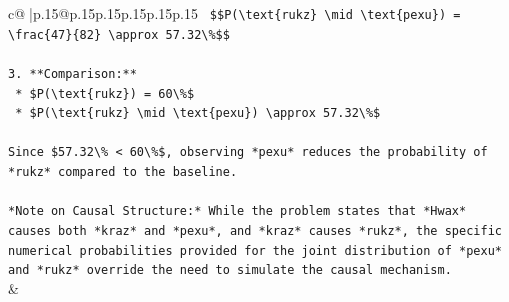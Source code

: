 \documentclass{article}
\begin{document}
{\begin{supertabular}{c@{$\;$}|p{.15\linewidth}@{}p{.15\linewidth}p{.15\linewidth}p{.15\linewidth}p{.15\linewidth}p{.15\linewidth}}
{{{\texttt{    \$\$P(\textbackslash{}text\{rukz\} \textbackslash{}mid \textbackslash{}text\{pexu\}) = \textbackslash{}frac\{47\}\{82\} \textbackslash{}approx 57.32\textbackslash{}\%\$\$} \\
\\ 
\texttt{3.  **Comparison:**} \\
\texttt{    *   \$P(\textbackslash{}text\{rukz\}) = 60\textbackslash{}\%\$} \\
\texttt{    *   \$P(\textbackslash{}text\{rukz\} \textbackslash{}mid \textbackslash{}text\{pexu\}) \textbackslash{}approx 57.32\textbackslash{}\%\$} \\
\\ 
\texttt{Since \$57.32\textbackslash{}\% < 60\textbackslash{}\%\$, observing *pexu* reduces the probability of *rukz* compared to the baseline.} \\
\\ 
\texttt{*Note on Causal Structure:* While the problem states that *Hwax* causes both *kraz* and *pexu*, and *kraz* causes *rukz*, the specific numerical probabilities provided for the joint distribution of *pexu* and *rukz* override the need to simulate the causal mechanism.} \\
            }
        }
    }
    & \\ \\


\end{supertabular}}
\end{document}
